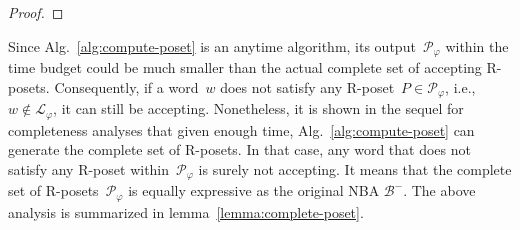 \begin{proof}
\end{proof}



Since Alg.~\ref{alg:compute-poset} is an anytime algorithm,
its output~$\mathcal{P}_{\varphi}$ within the time budget
could be much smaller than the actual complete set of accepting R-posets.
Consequently, if a word~$w$ does not satisfy
any R-poset~$P\in \mathcal{P}_{\varphi}$, i.e.,~$w\notin \mathcal{L}_{\varphi}$,
it can still be accepting.
Nonetheless, it is shown in the sequel for completeness analyses that
given enough time, Alg.~\ref{alg:compute-poset} can generate
the complete set of R-posets.
In that case, any word that does not satisfy any R-poset
within~$\mathcal{P}_{\varphi}$ is surely not accepting.
It means that the complete set of R-posets~$\mathcal{P}_{\varphi}$ is
equally expressive as the original NBA $\mathcal{B}^-$.
The above analysis is summarized in lemma~\ref{lemma:complete-poset}.

